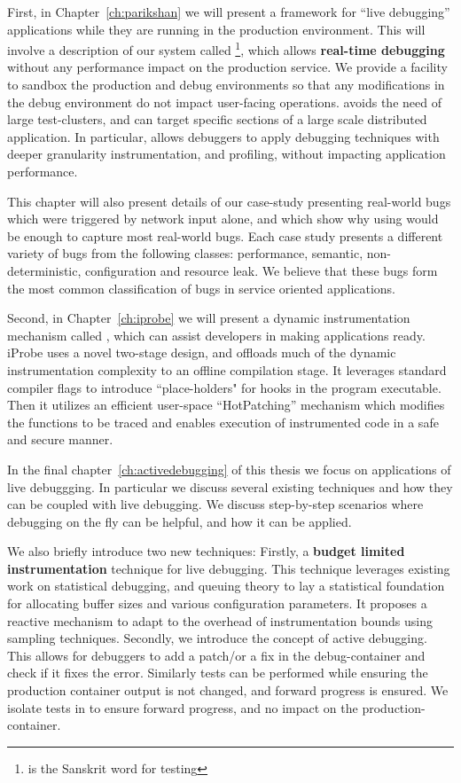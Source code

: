 First, in Chapter~\ref{ch:parikshan} we will present a framework for ``live debugging'' applications while they are running in the production environment.
This will involve a description of our system called \parikshan\footnote{\parikshan is the Sanskrit word for  testing}, which allows \textbf{real-time debugging} without any performance impact on the production service.
We provide a facility to sandbox the production and debug environments so that any modifications in the debug environment do not impact user-facing operations.
\parikshan avoids the need of large test-clusters, and can target specific sections of a large scale distributed application.
In particular, \parikshan allows debuggers to apply debugging techniques with deeper granularity instrumentation, and profiling, without impacting application performance.

This chapter will also present details of our case-study presenting real-world bugs which were triggered by network input alone, and which show why using \parikshan would be enough to capture most real-world bugs. 
Each case study presents a different variety of bugs from the following classes: performance, semantic, non-deterministic, configuration and resource leak. 
We believe that these bugs form the most common classification of bugs in service oriented applications.

Second, in Chapter~\ref{ch:iprobe} we will present a dynamic instrumentation mechanism called \iprobe, which can assist developers in making applications \parikshan ready.
iProbe uses a novel two-stage design, and offloads much of the dynamic instrumentation complexity to an offline compilation stage.
It leverages standard compiler flags to introduce ``place-holders" for hooks in the program executable.
Then it utilizes an efficient user-space ``HotPatching'' mechanism which modifies the functions to be traced and enables execution of instrumented code in a safe and secure manner.

In the final chapter~\ref{ch:activedebugging} of this thesis we focus on applications of live debuggging. 
In particular we discuss several existing techniques and how they can be coupled with live debugging. 
We discuss step-by-step scenarios where debugging on the fly can be helpful, and how it can be applied.

We also briefly introduce two new techniques: Firstly, a \textbf{budget limited instrumentation} technique for live debugging.
This technique leverages existing work on statistical debugging, and queuing theory to lay a statistical foundation for allocating buffer sizes and various configuration parameters.
It proposes a reactive mechanism to adapt to the overhead of instrumentation bounds using sampling techniques.
Secondly, we introduce the concept of active debugging.
This allows for debuggers to add a patch/or a fix in the debug-container and check if it fixes the error. 
Similarly tests can be performed while ensuring the production container output is not changed, and forward progress is ensured.
We isolate tests in \debugcontainer to ensure forward progress, and no impact on the production-container.

